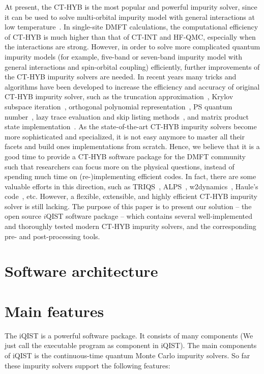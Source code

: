 At present, the CT-HYB is the most popular and powerful impurity solver, since it can be used to solve multi-orbital impurity model with general interactions at low temperature~\cite{RevModPhys.83.349}. In single-site DMFT calculations, the computational efficiency of CT-HYB is much higher than that of CT-INT and HF-QMC, especially when the interactions are  strong. However, in order to solve more complicated quantum impurity models (for example, five-band or seven-band impurity model with general interactions and spin-orbital coupling) efficiently, further improvements of the CT-HYB impurity solvers are needed. In recent years many tricks and algorithms have been developed to increase the efficiency and accuracy of original CT-HYB impurity solver, such as the truncation approximation~\cite{PhysRevB.75.155113}, Krylov subspace iteration~\cite{PhysRevB.80.235117}, orthogonal polynomial representation~\cite{PhysRevB.84.075145,PhysRevB.85.205106}, PS quantum number~\cite{PhysRevB.86.155158}, lazy trace evaluation and skip listing methods~\cite{arXiv:1403.7214}, and matrix product state implementation~\cite{1742-5468-2014-6-P06012}. As the state-of-the-art CT-HYB impurity solvers become more sophisticated and specialized, it is not easy anymore to master all their facets and build ones implementations from scratch. Hence, we believe that it is a good time to provide a CT-HYB software package for the DMFT community such that researchers can focus more on the physical questions, instead of spending much time on (re-)implementing efficient codes. In fact, there are some valuable efforts in this direction, such as TRIQS~\cite{triqs}, ALPS~\cite{1742-5468-2011-05-P05001}, w2dynamics~\cite{w2dynamics}, Haule's code~\cite{haule}, etc. However, a flexible, extensible, and highly efficient CT-HYB impurity solver is still lacking. The purpose of this paper is to present our solution -- the open source $i$QIST software package -- which contains several well-implemented and thoroughly tested modern CT-HYB impurity solvers, and the corresponding pre- and post-processing tools.

\section{Software architecture}
\section{Main features}

The iQIST is a powerful software package. It consists of many components
(We just call the executable program as component in iQIST). The main
components of iQIST is the continuous-time quantum Monte Carlo impurity
solvers. So far these impurity solvers support the following features:

